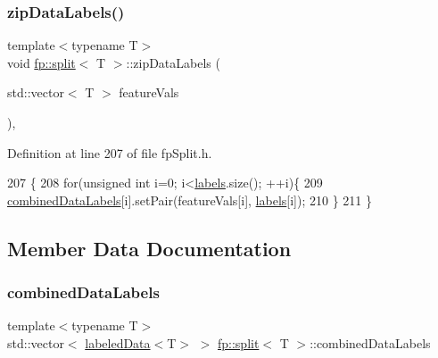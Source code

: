 \subsubsection{\texorpdfstring{zip\+Data\+Labels()}{zipDataLabels()}}
{\footnotesize\ttfamily template$<$typename T$>$ \\
void \hyperlink{classfp_1_1split}{fp\+::split}$<$ T $>$\+::zip\+Data\+Labels (\begin{DoxyParamCaption}\item[{std\+::vector$<$ T $>$}]{feature\+Vals }\end{DoxyParamCaption})\hspace{0.3cm}{\ttfamily [inline]}, {\ttfamily [protected]}}



Definition at line 207 of file fp\+Split.\+h.


\begin{DoxyCode}
207                                                                    \{
208                     \textcolor{keywordflow}{for}(\textcolor{keywordtype}{unsigned} \textcolor{keywordtype}{int} i=0; i<\hyperlink{classfp_1_1split_a9658b163c2cd30e9900e21c3b1c3f2f9}{labels}.size(); ++i)\{
209                         \hyperlink{classfp_1_1split_ac8f54cf4a42335814e10e351c49e3c32}{combinedDataLabels}[i].setPair(featureVals[i],
      \hyperlink{classfp_1_1split_a9658b163c2cd30e9900e21c3b1c3f2f9}{labels}[i]);
210                     \}
211                 \}
\end{DoxyCode}


\subsection{Member Data Documentation}
\mbox{\label{classfp_1_1split_ac8f54cf4a42335814e10e351c49e3c32}} 
\subsubsection{\texorpdfstring{combined\+Data\+Labels}{combinedDataLabels}}
{\footnotesize\ttfamily template$<$typename T$>$ \\
std\+::vector$<$ \hyperlink{classfp_1_1labeledData}{labeled\+Data}$<$T$>$ $>$ \hyperlink{classfp_1_1split}{fp\+::split}$<$ T $>$\+::combined\+Data\+Labels\hspace{0.3cm}{\ttfamily [protected]}}



